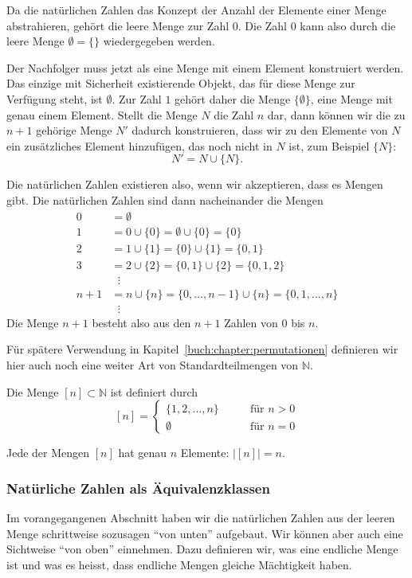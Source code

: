 Da die natürlichen Zahlen das Konzept der Anzahl der Elemente einer
Menge abstrahieren, gehört die leere Menge zur Zahl $0$.
Die Zahl $0$ kann also durch die leere Menge $\emptyset = \{\}$
wiedergegeben werden.

Der Nachfolger muss jetzt als eine Menge mit einem Element konstruiert
werden.
Das einzige mit Sicherheit existierende Objekt, das für diese Menge
zur Verfügung steht, ist $\emptyset$.
Zur Zahl $1$ gehört daher die Menge $\{\emptyset\}$, eine Menge mit
genau einem Element.
Stellt die Menge $N$ die Zahl $n$ dar, dann können wir die zu $n+1$
gehörige Menge $N'$ dadurch konstruieren, dass wir zu den Elemente
von $N$ ein zusätzliches Element hinzufügen, das noch nicht in $N$ ist,
zum Beispiel $\{N\}$:
\[
N' = N \cup \{ N \}.
\]

Die natürlichen Zahlen existieren also, wenn wir akzeptieren, dass es
Mengen gibt.
Die natürlichen Zahlen sind dann nacheinander die Mengen
\begin{align*}
0 &= \emptyset 
\\
1 &= 0 \cup \{0\} = \emptyset \cup \{0\} = \{0\}
\\
2 &= 1 \cup \{1\} = \{0\}\cup\{1\} = \{0,1\}
\\
3 &= 2 \cup \{2\} = \{0,1\}\cup \{2\} = \{0,1,2\}
\\
&\phantom{n}\vdots
\\
n+1&= n \cup \{n\} = \{0,\dots,n-1\} \cup \{n\} = \{0,1,\dots,n\}
\\
&\phantom{n}\vdots
\end{align*}
Die Menge $n+1$ besteht also aus den $n+1$ Zahlen von $0$ bis $n$.

Für spätere Verwendung in Kapitel~\ref{buch:chapter:permutationen}
definieren wir hier auch noch eine weiter Art von Standardteilmengen
von $\mathbb{N}$.

\begin{definition}
\label{buch:zahlen:def:[n]}
Die Menge $[n]\subset \mathbb{N}$ ist definiert durch
\[
[n] = \begin{cases}
\{1,2,\dots,n\}&\qquad \text{für $n>0$}\\
\emptyset&\qquad\text{für $n=0$}
\end{cases}
\]
\end{definition}

Jede der Mengen $[n]$ hat genau $n$ Elemente: $|[n]|=n$.

\subsubsection{Natürliche Zahlen als Äquivalenzklassen}
Im vorangegangenen Abschnitt haben wir die natürlichen Zahlen aus
der leeren Menge schrittweise sozusagen ``von unten'' aufgebaut.
Wir können aber auch eine Sichtweise ``von oben'' einnehmen.
Dazu definieren wir, was eine endliche Menge ist und was es heisst,
dass endliche Mengen gleiche Mächtigkeit haben.

